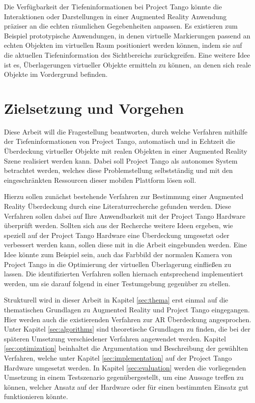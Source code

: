 Die Verfügbarkeit der Tiefeninformationen bei Project Tango könnte die Interaktionen oder Darstellungen in einer Augmented Reality Anwendung präziser an die echten räumlichen Gegebenheiten anpassen. Es existieren zum Beispiel prototypische Anwendungen, in denen virtuelle Markierungen passend an echten Objekten im virtuellen Raum positioniert werden können, indem sie auf die aktuellen Tiefeninformation des Sichtbereichs zurückgreifen. Eine weitere Idee ist es, Überlagerungen virtueller Objekte ermitteln zu können, an denen sich reale Objekte im Vordergrund befinden.

\section{Zielsetzung und Vorgehen}

Diese Arbeit will die Fragestellung beantworten, durch welche Verfahren mithilfe der Tiefeninformationen von Project Tango, automatisch und in Echtzeit die Überdeckung virtueller Objekte mit realen Objekten in einer Augmented Reality Szene realisiert werden kann. Dabei soll Project Tango als autonomes System betrachtet werden, welches diese Problemstellung selbstständig und mit den eingeschränkten Ressourcen dieser mobilen Plattform lösen soll.

Hierzu sollen zunächst bestehende Verfahren zur Bestimmung einer Augmented Reality Überdeckung durch eine Literaturrecherche gefunden werden. Diese Verfahren sollen dabei auf Ihre Anwendbarkeit mit der Project Tango Hardware überprüft werden. Sollten sich aus der Recherche weitere Ideen ergeben, wie speziell auf der Project Tango Hardware eine Überdeckung umgesetzt oder verbessert werden kann, sollen diese mit in die Arbeit eingebunden werden. Eine Idee könnte zum Beispiel sein, auch das Farbbild der normalen Kamera von Project Tango in die Optimierung der virtuellen Überlagerung einfließen zu lassen. Die identifizierten Verfahren sollen hiernach entsprechend implementiert werden, um sie darauf folgend in einer Testumgebung gegenüber zu stellen.

Strukturell wird in dieser Arbeit in Kapitel \ref{sec:thema} erst einmal auf die thematischen Grundlagen zu Augmented Reality und Project Tango eingegangen. Hier werden auch die existierenden Verfahren zur AR Überdeckung angesprochen. Unter Kapitel \ref{sec:algorithms} sind theoretische Grundlagen zu finden, die bei der späteren Umsetzung verschiedener Verfahren angewendet werden. Kapitel \ref{sec:optimization} beinhaltet die Argumentation und Beschreibung der gewählten Verfahren, welche unter Kapitel \ref{sec:implementation} auf der Project Tango Hardware umgesetzt werden. In Kapitel \ref{sec:evaluation} werden die vorliegenden Umsetzung in einem Testszenario gegenübergestellt, um eine Aussage treffen zu können, welcher Ansatz auf der Hardware oder für einen bestimmten Einsatz gut funktionieren könnte.


